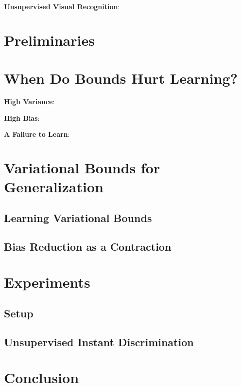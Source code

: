 \documentclass{article}
\begin{document}
\textbf{Unsupervised Visual Recognition}:

\section{Preliminaries}

\section{When Do Bounds Hurt Learning?}

\textbf{High Variance}:

\textbf{High Bias}: 

\textbf{A Failure to Learn}: 

\section{Variational Bounds for Generalization}

\subsection{Learning Variational Bounds}

\subsection{Bias Reduction as a Contraction}

\section{Experiments}
\subsection{Setup}

\subsection{Unsupervised Instant Discrimination}

\section{Conclusion}

 
\small{}

% 
\end{document}

